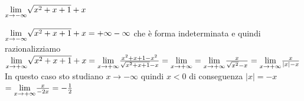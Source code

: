 \documentclass[12pt]{report}
\newcounter{exercise}
\begin{document}
	\begin{assignment}{}{}
		$\mathlarger{\lim_{x \to -\infty}}\sqrt{x^2 + x + 1} + x$
		\begin{exercise}{}{}
			$\mathlarger{\lim_{x \to -\infty}}\sqrt{x^2 + x + 1} + x = +\infty - \infty$ che è forma indeterminata e quindi razionalizziamo \\
			$\mathlarger{\lim_{x \to +\infty}}\sqrt{x^2 + x + 1} +x = \mathlarger{\lim_{x \to +\infty}}\frac{x^2 + x + 1 - x^2}{\sqrt{x^2 + x + 1} - x} = \mathlarger{\lim_{x \to +\infty}} = \mathlarger{\lim_{x \to +\infty}}\frac{x}{\sqrt{x^2} - x} = \mathlarger{\lim_{x \to +\infty}}\frac{x}{|x| - x}$ \\
			In questo caso sto studiano $x \to -\infty$ quindi $x<0$ di conseguenza $|x| = -x$ \\
			$= \mathlarger{\lim_{x \to +\infty}}\frac{x}{-2x} = -\frac{1}{2}$
		\end{exercise}
	\end{assignment}
\end{document}
